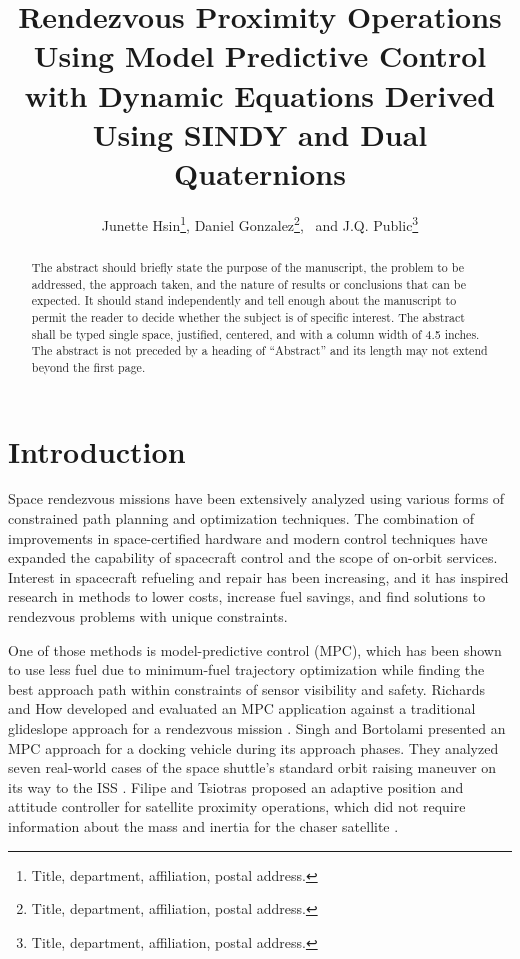 \documentclass[letterpaper, preprint, paper,11pt]{AAS}	%
\begin{document}
\title{Rendezvous Proximity Operations Using Model Predictive Control with Dynamic Equations Derived Using SINDY and Dual Quaternions}

\author{Junette Hsin\thanks{Title, department, affiliation, postal address.},  
Daniel Gonzalez\thanks{Title, department, affiliation, postal address.},
\ and J.Q. Public\thanks{Title, department, affiliation, postal address.}
}


\maketitle{} 		


\begin{abstract}
	
The abstract should briefly state the purpose of the manuscript, the problem to be addressed, the approach taken, and the nature of results or conclusions that can be expected. It should stand independently and tell enough about the manuscript to permit the reader to decide whether the subject is of specific interest. The abstract shall be typed single space, justified, centered, and with a column width of 4.5 inches. The abstract is not preceded by a heading of ``Abstract'' and its length may not extend beyond the first page.

\end{abstract}








\section{Introduction}
%

Space rendezvous missions have been extensively analyzed using various forms of constrained path planning and optimization techniques. The combination of improvements in space-certified hardware and modern control techniques have expanded the capability of spacecraft control and the scope of on-orbit services. Interest in spacecraft refueling and repair has been increasing, and it has inspired research in methods to lower costs, increase fuel savings, and find solutions to rendezvous problems with unique constraints. 

One of those methods is model-predictive control (MPC), which has been shown to use less fuel due to minimum-fuel trajectory optimization while finding the best approach path within constraints of sensor visibility and safety. Richards and How developed and evaluated an MPC application against a traditional glideslope approach for a rendezvous mission \cite{}. Singh and Bortolami presented an MPC approach for a docking vehicle during its approach phases. They analyzed seven real-world cases of the space shuttle's standard orbit raising maneuver on its way to the ISS \cite{}. Filipe and Tsiotras proposed an adaptive position and attitude controller for satellite proximity operations, which did not require information about the mass and inertia for the chaser satellite \cite{}. 
\end{document}
